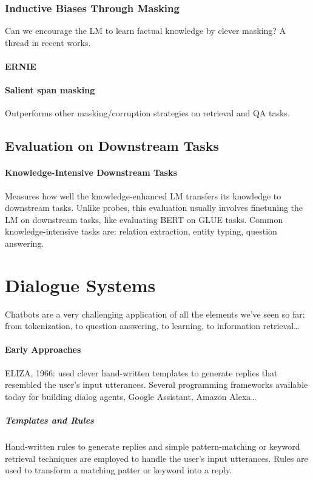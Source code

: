 \documentclass[10pt]{report}
\begin{document}
\subsubsection{Inductive Biases Through Masking} Can we encourage the LM to learn factual knowledge by clever masking? A thread in recent works.
\paragraph{ERNIE}
\paragraph{Salient span masking} Outperforms other masking/corruption strategies on retrieval and QA tasks.
\subsection{Evaluation on Downstream Tasks}
\paragraph{Knowledge-Intensive Downstream Tasks} Measures how well the knowledge-enhanced LM transfers its knowledge to downstream tasks. Unlike probes, this evaluation usually involves finetuning the LM on downstream tasks, like evaluating BERT on GLUE tasks. Common knowledge-intensive tasks are: relation extraction, entity typing, question answering.
\section{Dialogue Systems}
Chatbots are a very challenging application of all the elements we've seen so far: from tokenization, to question answering, to learning, to information retrieval\ldots
\paragraph{Early Approaches} ELIZA, 1966: used clever hand-written templates to generate replies that resembled the user's input utterances. Several programming frameworks available today for building dialog agents, Google Assistant, Amazon Alexa\ldots
\subparagraph{Templates and Rules} Hand-written rules to generate replies and simple pattern-matching or keyword retrieval techniques are employed to handle the user's input utterances. Rules are used to transform a matching patter or keyword into a reply.
\end{document}
